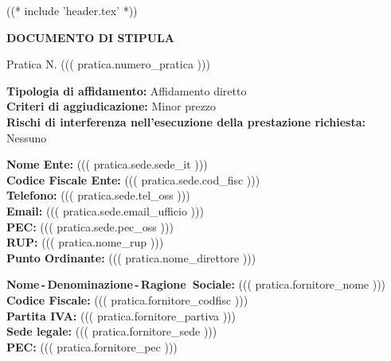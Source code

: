 
((* include 'header.tex' *))


\topaddr

\begin{center}
	\textbf{DOCUMENTO DI STIPULA}
\end{center}

Pratica N. ((( pratica.numero_pratica )))



\textbf{Tipologia di affidamento:} Affidamento diretto \\
\textbf{Criteri di aggiudicazione:} Minor prezzo \\
\textbf{Rischi di interferenza nell'esecuzione della prestazione richiesta:} Nessuno \\


\textbf{Nome Ente:} ((( pratica.sede.sede_it ))) \\
\textbf{Codice Fiscale Ente:} ((( pratica.sede.cod_fisc ))) \\
\textbf{Telefono:} ((( pratica.sede.tel_oss ))) \\
\textbf{Email:} ((( pratica.sede.email_ufficio ))) \\
\textbf{PEC:} ((( pratica.sede.pec_oss ))) \\
\textbf{RUP:} ((( pratica.nome_rup ))) \\
\textbf{Punto Ordinante:} ((( pratica.nome_direttore ))) \\


\textbf{Nome\,-\,Denominazione\,-\,Ragione~Sociale:} ((( pratica.fornitore_nome ))) \\
\textbf{Codice Fiscale:} ((( pratica.fornitore_codfisc ))) \\
\textbf{Partita IVA:} ((( pratica.fornitore_partiva ))) \\
\textbf{Sede legale:} ((( pratica.fornitore_sede ))) \\
\textbf{PEC:} ((( pratica.fornitore_pec ))) \\

